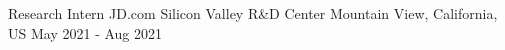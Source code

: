 \begin{cventries}
\cventry
{Research Intern} %
{JD.com Silicon Valley R\&D Center} %
{Mountain View, California, US} %
{May 2021 - Aug 2021} %
{ %
}


\end{cventries}